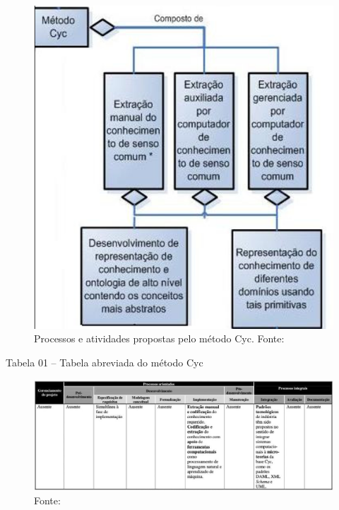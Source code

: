 \documentclass[a4paper]{report}
\begin{document}
\begin{figure}[h] 
\centering %
\includegraphics[scale=0.6]{Figuras/1.png} %
\caption[Processos e atividades propostas pelo método Cyc]{Processos e atividades propostas pelo método Cyc. Fonte: \cite{DanielaLucas:2008}}
\end{figure}

\pagebreak

Tabela 01 – Tabela abreviada do método Cyc
                                  
\begin{figure}[h] 
\centering %
\includegraphics[scale=0.4]{Figuras/2.png} %
\caption{Fonte: \cite{DanielaLucas:2008}}
\end{figure}
\end{document}
